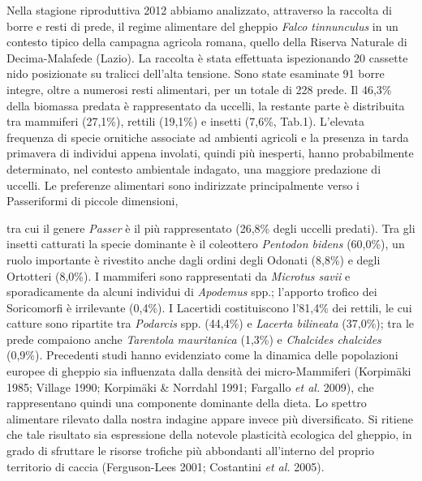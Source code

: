 Nella stagione riproduttiva 2012 abbiamo analizzato, attraverso la
raccolta di borre e resti di prede, il regime alimentare del gheppio
\textit{Falco tinnunculus} in un contesto tipico della campagna
agricola romana, quello della Riserva Naturale di Decima-Malafede
(Lazio). La raccolta \`e stata effettuata ispezionando 20 cassette nido
posizionate su tralicci dell{\textquoteright}alta tensione. Sono state
esaminate 91 borre integre, oltre a numerosi resti alimentari, per un
totale di {228 prede. Il 46,3\% della biomassa predata
\`e rappresentato da uccelli, la restante parte \`e distribuita tra
mammiferi (27,1\%), rettili (19,1\%) e insetti (7,6\%, Tab.1).}
{L{\textquoteright}}elevata frequenza di specie
ornitiche associate {ad ambienti agricoli e la
presenza in tarda primavera di individui appena involati, quindi pi\`u
inesperti, }hanno {probabilmente determinato, nel
contesto ambientale indagato, una maggiore predazione di uccelli. Le
preferenze alimentari sono indirizzate principalmente verso i
Passeriformi di piccole dimensioni,}

{tra cui il genere }\textit{{Passer}}
\`e il pi\`u rappresentato (26,8\% degli uccelli predati).
{Tra gli insetti catturati la specie dominante \`e il
coleottero }\textit{{Pentodon
bidens}} { (60,0\%), un ruolo importante \`e rivestito
anche dagli ordini degli Odonati (8,8\%) e degli Ortotteri (8,0\%). }I
mammiferi sono rappresentati da \textit{Microtus savii} e
sporadicamente da alcuni individui di \textit{Apodemus }spp.;
l{\textquoteright}apporto trofico dei Soricomorfi \`e irrilevante
(0,4\%). {I Lacertidi costituiscono
l{\textquoteright}81,4\% dei rettili, le cui catture sono ripartite tra
}\textit{{Podarcis }}{spp. (44,4\%) e
}\textit{{Lacerta bilineata}} {
(37,0\%); tra le prede compaiono anche
}\textit{{Tarentola mauritanica
}}{(1,3\%) e }\textit{{Chalcides
chalcides }}{(0,9\%). Precedenti studi hanno
evidenziato come la dinamica delle popolazioni europee di gheppio sia
influenzata dalla densit\`a dei micro-Mammiferi (Korpim\"aki 1985;
Village 1990; Korpim\"aki \& Norrdahl 1991; Fargallo 
}\textit{{et al.}}{ 2009), che
rappresentano quindi una componente dominante della dieta. Lo spettro
alimentare rilevato dalla nostra indagine appare invece pi\`u
diversificato. Si ritiene che tale risultato sia espressione della
}notevole plasticit\`a ecologica del gheppio, in grado di sfruttare le
risorse trofiche pi\`u abbondanti all'interno del
proprio territorio di caccia (Ferguson-Lees 2001; Costantini \textit{et
al.} 2005).

